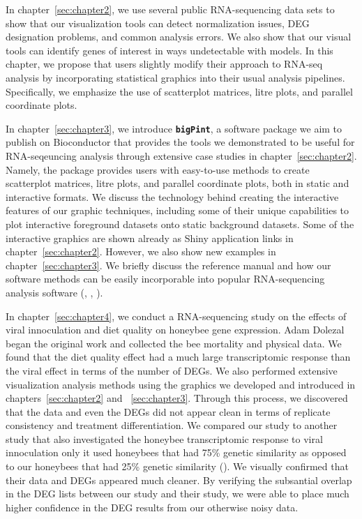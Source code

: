 \documentclass[11pt,a4paper,oldfontcommands,openany]{memoir}
\numberwithin{equation}{section} %
\newcommand{\pkg}[1]{{\texttt{#1}}}
\begin{document}
In chapter~\ref{sec:chapter2}, we use several public RNA-sequencing data sets to show that our visualization tools can detect normalization issues, DEG designation problems, and common analysis errors. We also show that our visual tools can identify genes of interest in ways undetectable with models. In this chapter, we propose that users slightly modify their approach to RNA-seq analysis by incorporating statistical graphics into their usual analysis pipelines. Specifically, we emphasize the use of scatterplot matrices, litre plots, and parallel coordinate plots.

In chapter~\ref{sec:chapter3}, we introduce \textbf{\pkg{bigPint}}, a software package we aim to publish on Bioconductor that provides the tools we demonstrated to be useful for RNA-seqeuncing analysis through extensive case studies in chapter~\ref{sec:chapter2}. Namely, the package provides users with easy-to-use methods to create scatterplot matrices, litre plots, and parallel coordinate plots, both in static and interactive formats. We discuss the technology behind creating the interactive features of our graphic techniques, including some of their unique capabilities to plot interactive foreground datasets onto static background datasets. Some of the interactive graphics are shown already as Shiny application links in chapter~\ref{sec:chapter2}. However, we also show new examples in chapter~\ref{sec:chapter3}. We briefly discuss the reference manual and how our software methods can be easily incorporable into popular RNA-sequencing analysis software (\citealt{deseq2}, \citealt{edger}, \citealt{limma}).

In chapter~\ref{sec:chapter4}, we conduct a RNA-sequencing study on the effects of viral innoculation and diet quality on honeybee gene expression. Adam Dolezal began the original work and collected the bee mortality and physical data. We found that the diet quality effect had a much large transcriptomic response than the viral effect in terms of the number of DEGs. We also performed extensive visualization analysis methods using the graphics we developed and introduced in chapters~\ref{sec:chapter2} and ~\ref{sec:chapter3}. Through this process, we discovered that the data and even the DEGs did not appear clean in terms of replicate consistency and treatment differentiation. We compared our study to another study that also investigated the honeybee transcriptomic response to viral innoculation only it used honeybees that had 75\% genetic similarity as opposed to our honeybees that had 25\% genetic similarity (\citealt{galbraith}). We visually confirmed that their data and DEGs appeared much cleaner. By verifying the subsantial overlap in the DEG lists between our study and their study, we were able to place much higher confidence in the DEG results from our otherwise noisy data.
\end{document}

